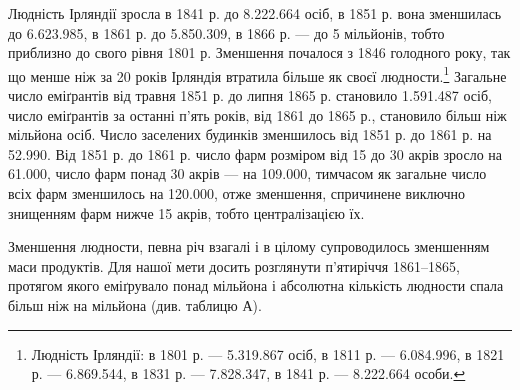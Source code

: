 Людність Ірляндії зросла в 1841 р. до 8.222.664 осіб, в 1851 р.
вона зменшилась до 6.623.985, в 1861 р. до 5.850.309, в 1866 р. —
до 5 мільйонів, тобто приблизно до свого рівня 1801 р. Зменшення
почалося з 1846 голодного року, так що менше ніж за
20 років Ірляндія втратила більше як  своєї людности.\footnote{
Людність Ірляндії: в 1801 р. — 5.319.867 осіб, в 1811 р. — 6.084.996,
в 1821 р. — 6.869.544, в 1831 р. — 7.828.347, в 1841 р. — 8.222.664 особи.
}
Загальне число еміґрантів від травня 1851 р. до липня 1865 р.
становило 1.591.487 осіб, число еміґрантів за останні п’ять років,
від 1861 до 1865 р., становило більш ніж  мільйона осіб. Число
заселених будинків зменшилось від 1851 р. до 1861 р. на 52.990.
Від 1851 р. до 1861 р. число фарм розміром від 15 до 30 акрів зросло
на 61.000, число фарм понад 30 акрів — на 109.000, тимчасом
як загальне число всіх фарм зменшилось на 120.000, отже зменшення,
спричинене виключно знищенням фарм нижче 15 акрів,
тобто централізацією їх.

Зменшення людности, певна річ взагалі і в цілому супроводилось
зменшенням маси продуктів. Для нашої мети досить
розглянути п’ятиріччя 1861--1865, протягом якого еміґрувало
понад  мільйона і абсолютна кількість людности спала
більш ніж на  мільйона (див. таблицю А).

